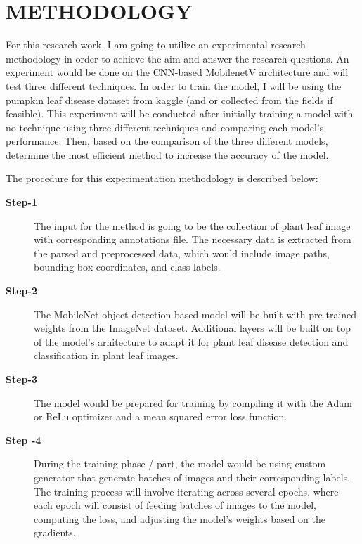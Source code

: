 \chapter{METHODOLOGY}

For this research work, I am going to utilize an experimental research methodology in order to achieve the aim and answer the research questions. An experiment would be done on the CNN-based MobilenetV architecture and will test three different techniques. In order to train the model, I will be using the pumpkin leaf disease dataset from kaggle (and or collected from the fields if feasible). This experiment will be conducted after initially training a model with no technique using three different techniques and comparing each model's performance. Then, based on the comparison of the three different models, determine the most efficient method to increase the accuracy of the model.

The procedure for this experimentation methodology is described below:
\begin{description}
	\item[\bfseries Step-1] The input for the method is going to be the collection of plant leaf image with corresponding annotations file. The necessary data is extracted from the parsed and preprocessed data, which would include image paths, bounding box coordinates, and class labels.
	
	
	\item[\bfseries Step-2]	The MobileNet object detection based model will be built with pre-trained weights from the ImageNet dataset. Additional layers will be built on top of the model's arhitecture to adapt it for plant leaf disease detection and classification in plant leaf images.
	
	\item[\bfseries Step-3]	 The model would be prepared for training by compiling it with the Adam or ReLu optimizer and a mean squared error loss function.
	
	\item[\bfseries Step -4] During the training phase / part, the model would be using custom generator that generate batches of images and their corresponding labels. The training process will involve iterating across several epochs, where each epoch will consist of feeding batches of images to the model, computing the loss, and adjusting the model's weights based on the gradients. 
	
	
\end{description}
 
